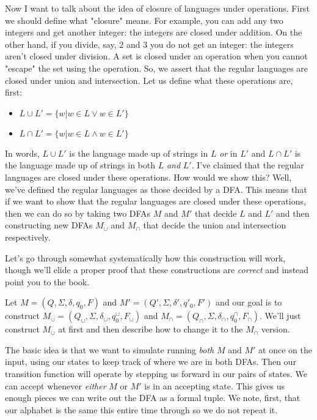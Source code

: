 \documentclass[11pt]{article}
\begin{document}
Now I want to talk about the idea of closure of languages under operations. First we should define what "closure" means. For example, you can add any two integers and get another integer: the integers are closed under addition. On the other hand, if you divide, say, $2$ and $3$ you do not get an integer: the integers aren't closed under division. A set is closed under an operation when you cannot "escape" the set using the operation. So, we assert that the regular languages are closed under union and intersection. Let us define what these operations are, first:

\begin{itemize}
\item $L \cup L' = \{ w | w \in L \vee w \in L'\}$
\item $L \cap L' = \{ w | w \in L \wedge w \in L'\}$
\end{itemize}

In words, $L \cup L'$ is the language made up of strings in $L$ \emph{or} in $L'$ and $L \cap L'$ is the language made up of strings in both $L$ \emph{and} $L'$. I've claimed that the regular languages are closed under these operations. How would we show this? Well, we've defined the regular languages as those decided by a DFA. This means that if we want to show that the regular languages are closed under these operations, then we can do so by taking two DFAs $M$ and $M'$ that decide $L$ and $L'$ and then constructing new DFAs $M_{\cup}$ and $M_{\cap}$ that decide the union and intersection respectively.

Let's go through somewhat systematically how this construction will work, though we'll elide a proper proof that these constructions are \emph{correct} and instead point you to the book.

Let $M = (Q,\Sigma,\delta,q_0,F)$ and $M' = (Q',\Sigma,\delta',q'_0,F')$ and our goal is to construct $M_{\cup} = (Q_{\cup},\Sigma,\delta_{\cup},q^{\cup}_0,F_{\cup})$ and $M_{\cap} = (Q_{\cap},\Sigma,\delta_{\cap},q^{\cap}_0,F_{\cap})$. We'll just construct $M_{\cup}$ at first and then describe how to change it to the $M_{\cap}$ version.

The basic idea is that we want to simulate running \emph{both} $M$ and $M'$ at once on the input, using our states to keep track of where we are in both DFAs. Then our transition function will operate by stepping us forward in our pairs of states. We can accept whenever \emph{either} $M$ or $M'$ is in an accepting state. This gives us enough pieces we can write out the DFA as a formal tuple. We note, first, that our alphabet is the same this entire time through so we do not repeat it.
\end{document}
